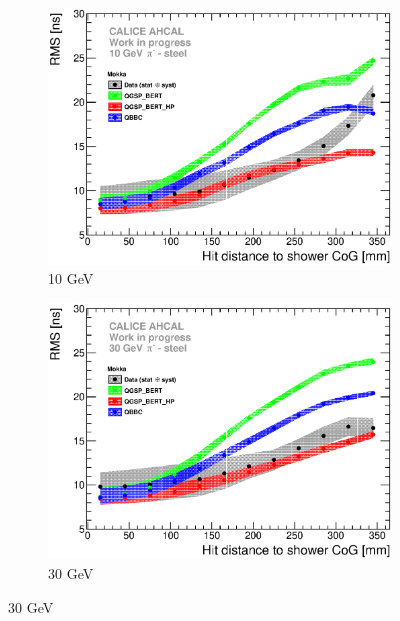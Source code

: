\begin{figure}[htbp!]
  \begin{subfigure}[t]{0.49\textwidth}
    \centering
    \includegraphics[width=1\textwidth]{../Thesis_Plots/Timing/Pions/Plots/ComparisonToSim/RMS_Radius_10GeV_BL_Mokka.eps}
    \caption{10 GeV}\label{fig:Radius_BL_RMS_SimData_10GeV}
  \end{subfigure}
  \hfill
  \begin{subfigure}[t]{0.49\textwidth}
    \centering
    \includegraphics[width=1\textwidth]{../Thesis_Plots/Timing/Pions/Plots/ComparisonToSim/RMS_Radius_30GeV_BL_Mokka.eps}
    \caption{30 GeV}\label{fig:Radius_BL_RMS_SimData_30GeV}
  \end{subfigure}
  \hfill

\end{figure}
